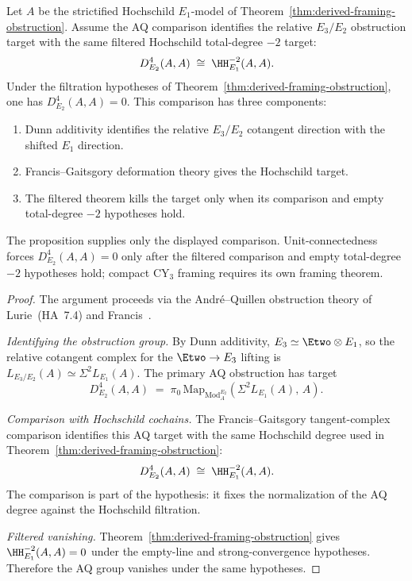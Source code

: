 \begin{proposition}
\label{prop:aq-e3-lifting-verification}
Let $A$ be the strictified Hochschild $E_1$-model of
Theorem~\ref{thm:derived-framing-obstruction}. Assume the AQ comparison
identifies the relative $E_3/E_2$ obstruction target with the same
filtered Hochschild total-degree $-2$ target:
\[
 D^4_{E_2}(A,A)
 \;\cong\;
 \HH^{-2}_{E_1}(A,A).
\]
Under the filtration hypotheses of
Theorem~\ref{thm:derived-framing-obstruction}, one has
$D^4_{E_2}(A,A)=0$. This comparison has three components:
\begin{enumerate}[label=\textup{(\roman*)}]
 \item Dunn additivity identifies the relative $E_3/E_2$ cotangent
 direction with the shifted $E_1$ direction.
 \item Francis--Gaitsgory deformation theory gives the Hochschild target.
 \item The filtered theorem kills the target only when its comparison and
 empty total-degree $-2$ hypotheses hold.
\end{enumerate}
The proposition supplies only the displayed comparison. Unit-connectedness
forces $D^4_{E_2}(A,A)=0$ only after the filtered comparison and empty
total-degree \(-2\) hypotheses hold; compact CY$_3$ framing requires its
own framing theorem.
\end{proposition}

\begin{proof}
The argument proceeds via the Andr\'e--Quillen obstruction theory of
Lurie~(HA~7.4) and Francis~\cite{Francis2013}.

\smallskip\noindent\emph{Identifying the obstruction group.}
By Dunn additivity, $E_3 \simeq \Etwo \otimes E_1$, so the relative
cotangent complex for the $\Etwo \to E_3$ lifting is
$L_{E_3/E_2}(A) \simeq \Sigma^2 L_{E_1}(A)$. The primary AQ obstruction
has target
\[
 D^4_{E_2}(A, A) \;=\; \pi_0\,\mathrm{Map}_{\mathrm{Mod}_A^{E_2}}(\Sigma^2 L_{E_1}(A),\, A).
\]

\smallskip\noindent\emph{Comparison with Hochschild cochains.}
The Francis--Gaitsgory tangent-complex comparison identifies this AQ
target with the same Hochschild degree used in
Theorem~\ref{thm:derived-framing-obstruction}:
\[
 D^4_{E_2}(A, A)
 \;\cong\;
 \HH^{-2}_{E_1}(A,A).
\]
The comparison is part of the hypothesis: it fixes the normalization of
the AQ degree against the Hochschild filtration.

\smallskip\noindent\emph{Filtered vanishing.}
Theorem~\ref{thm:derived-framing-obstruction} gives
$\HH^{-2}_{E_1}(A,A)=0$ under the empty-line and strong-convergence
hypotheses. Therefore the AQ group vanishes under the same hypotheses.
\end{proof}


